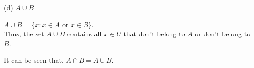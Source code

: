 \documentclass[12pt]{article}
\def\rectangle{(-3,-3) rectangle(5,3)}
\def\firstcircle{(0,0) circle(2)}
\def\secondcircle{(2,0) circle(2)}
\newenvironment{problem}[2][Problem]{\begin{trivlist}
		\item[\hskip \labelsep {\bfseries #1}\hskip \labelsep {\bfseries #2.}]}{\end{trivlist}}
\newenvironment{solution}[2][Solution]{\begin{trivlist}
		\item[\hskip \labelsep {\bfseries #1}\hskip \labelsep {\bfseries #2.}]}{\end{trivlist}}
\begin{document}
\begin{problem}{26}
\begin{solution}{c}
\begin{center}
			\end{center}
		\end{solution}
	(d) $\overline{A}\cup \overline{B}$
	\begin{solution}{d}
		$\overline{A}\cup \overline{B}=\{x:x\in \overline{A} \text{ or } x\in \overline{B} \}$.\\
		Thus, the set $\overline{A}\cup \overline{B}$ contains all $x\in U$ that don't belong to $A$ or don't belong to $B$.
			\begin{center}
		\end{center}
	It can be seen that, $\overline{A\cap B}=\overline{A}\cup \overline{B}$.
	\end{solution}
	\end{problem}
\end{document}
